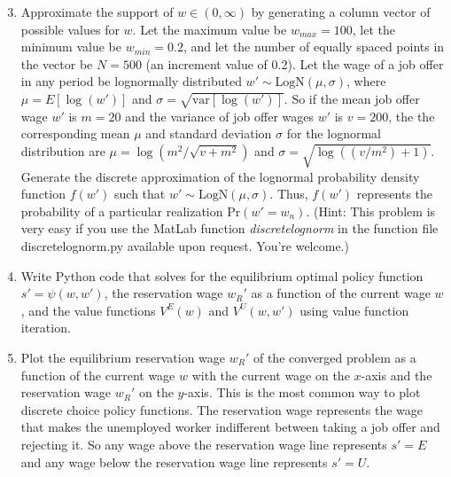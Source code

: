 \vspace{5mm}
   
\begin{enumerate}
   \setcounter{enumi}{2}
   
   \item Approximate the support of $w\in(0,\infty)$ by generating a column vector of possible values for $w$. Let the maximum value be $w_{max} = 100$, let the minimum value be $w_{min} = 0.2$, and let the number of equally spaced points in the vector be $N = 500$ (an increment value of 0.2). Let the wage of a job offer in any period be lognormally distributed $w'\sim \text{LogN}(\mu,\sigma)$, where $\mu = E\left[\log(w')\right]$ and $\sigma = \sqrt{\text{var}[\log(w')]}$. So if the mean job offer wage $w'$ is $m=20$ and the variance of job offer wages $w'$ is $v=200$, the the corresponding mean $\mu$ and standard deviation $\sigma$ for the lognormal distribution are $\mu=\log\left(m^2/\sqrt{v+m^2}\right)$ and $\sigma=\sqrt{\log\left((v/m^2)+1\right)}$. Generate the discrete approximation of the lognormal probability density function $f(w')$ such that $w'\sim \text{LogN}(\mu,\sigma)$. Thus, $f(w')$ represents the probability of a particular realization $\text{Pr}\left(w'=w_n\right)$. (Hint: This problem is very easy if you use the MatLab function \textit{discretelognorm} in the function file discretelognorm.py available upon request. You're welcome.)
   
   \item Write Python code that solves for the equilibrium optimal policy function $s' = \psi(w,w')$, the reservation wage $w_R'$ as a function of the current wage $w$, and the value functions $V^E(w)$ and $V^U(w,w')$ using value function iteration.
   
   \item Plot the equilibrium reservation wage $w_R'$ of the converged problem as a function of the current wage $w$ with the current wage on the $x$-axis and the reservation wage $w_R'$ on the $y$-axis. This is the most common way to plot discrete choice policy functions. The reservation wage represents the wage that makes the unemployed worker indifferent between taking a job offer and rejecting it. So any wage above the reservation wage line represents $s' = E$ and any wage below the reservation wage line represents $s' = U$.
   
\end{enumerate}
